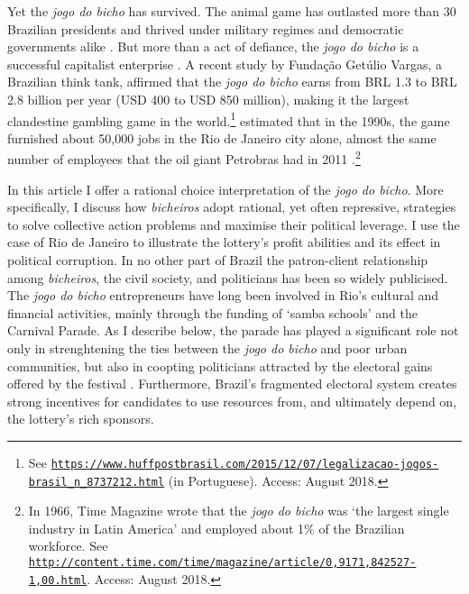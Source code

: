 \documentclass[a4paper,12pt]{article}
\begin{document}
Yet the \emph{jogo do bicho} has survived. The animal game has outlasted more than 30 Brazilian presidents and thrived under military regimes and democratic governments alike \citep{jupiara2015poroes}. But more than a act of defiance, the \emph{jogo do bicho} is a successful capitalist enterprise \citep{labronici2014sorteio, magalhaes2005ganhou}. A recent study by Fundação Getúlio Vargas, a Brazilian think tank, affirmed that the \emph{jogo do bicho} earns from BRL 1.3 to BRL 2.8 billion per year (USD 400 to USD 850 million), making it the largest clandestine gambling game in the world.\footnote{See \href{https://www.huffpostbrasil.com/2015/12/07/legalizacao-jogos-brasil_n_8737212.html}{\texttt{https://www.huffpostbrasil.com/2015/12/07/legalizacao-jogos-brasil\_n\_8737212.html}} (in Portuguese). Access: August 2018.} \citet[171]{schneider1996brazil} estimated that in the 1990s, the game furnished about 50,000 jobs in the Rio de Janeiro city alone, almost the same number of employees that the oil giant Petrobras had in 2011 \citep{exame2013petrobras}.\footnote{In 1966, Time Magazine wrote that the \emph{jogo do bicho} was `the largest single industry in Latin America' and employed about 1\% of the Brazilian workforce. See \href{http://content.time.com/time/magazine/article/0,9171,842527-1,00.html}{\texttt{http://content.time.com/time/magazine/article/0,9171,842527-1,00.html}}. Access: August 2018.}

In this article I offer a rational choice interpretation of the \emph{jogo do bicho}. More specifically, I discuss how \emph{bicheiros} adopt rational, yet often repressive, strategies to solve collective action problems and maximise their political leverage. I use the case of Rio de Janeiro to illustrate the lottery's profit abilities and its effect in political corruption. In no other part of Brazil the patron-client relationship among \emph{bicheiros}, the civil society, and politicians has been so widely publicised. The \emph{jogo do bicho} entrepreneurs have long been involved in Rio's cultural and financial activities, mainly through the funding of `samba schools' and the Carnival Parade. As I describe below, the parade has played a significant role not only in strenghtening the ties between the \emph{jogo do bicho} and poor urban communities, but also in coopting politicians attracted by the electoral gains offered by the festival \citep{cavalcanti2006carnaval, queiroz1992carnaval}. Furthermore, Brazil's fragmented electoral system creates strong incentives for candidates to use resources from, and ultimately depend on, the lottery's rich sponsors. 	 
\end{document}
